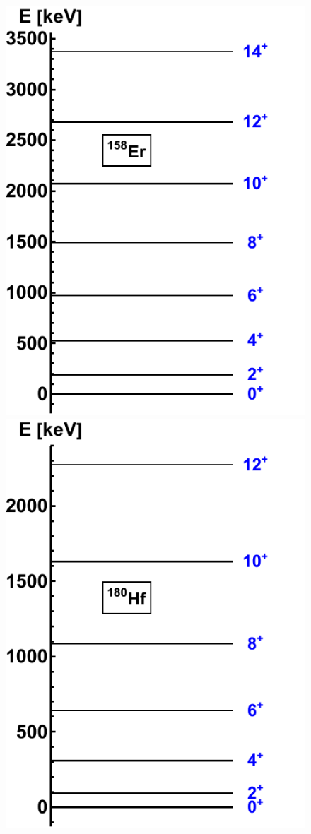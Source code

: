 \begin{figure}
    \centering
    \includegraphics[scale=0.7]{Chapters/Figures/Er158-Rotational-Bands.pdf}
    \includegraphics[scale=0.7]{Chapters/Figures/Hf180-Rotational-Bands.pdf}

\end{figure}

